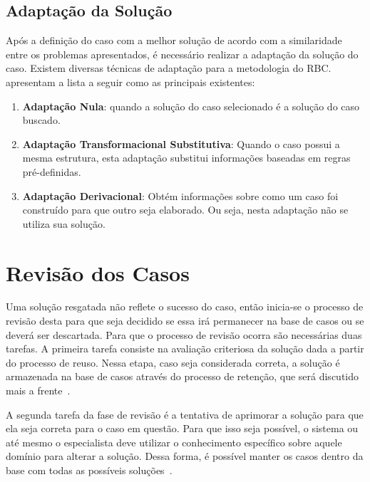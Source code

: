 \subsection{Adaptação da Solução}
\label{sec:adaptacaosolucao}

Após a definição do caso com a melhor solução de acordo com a similaridade entre os problemas apresentados, é necessário realizar a adaptação da solução do caso. Existem diversas técnicas de adaptação para a metodologia do RBC.  apresentam a lista a seguir como as principais existentes:

\begin{enumerate}
	\item \textbf{Adaptação Nula}: quando a solução do caso selecionado é a solução do caso buscado.
 	\item \textbf{Adaptação Transformacional Substitutiva}: Quando o caso possui a mesma estrutura, esta adaptação substitui informações baseadas em regras pré-definidas.
	\item \textbf{Adaptação Derivacional}: Obtém informações sobre como um caso foi construído para que outro seja elaborado. Ou seja, nesta adaptação não se utiliza sua solução.
\end{enumerate}

\section{Revisão dos Casos}
\label{sec:revisaocasos}

Uma solução resgatada não reflete o sucesso do caso, então inicia-se o processo de revisão desta para que seja decidido se essa irá permanecer na base de casos ou se deverá ser descartada. Para que o processo de revisão ocorra são necessárias duas tarefas. A primeira tarefa consiste na avaliação criteriosa da solução dada a partir do processo de reuso. Nessa etapa, caso seja considerada correta, a solução é armazenada na base de casos através do processo de retenção, que será discutido mais a frente~\cite{Gresse:2003}.

A segunda tarefa da fase de revisão é a tentativa de aprimorar a solução para que ela seja correta para o caso em questão. Para que isso seja possível, o sistema ou até mesmo o especialista deve utilizar o conhecimento específico sobre aquele domínio para alterar a solução. Dessa forma, é possível manter os casos dentro da base com todas as possíveis soluções~\cite{Gresse:2003}.

